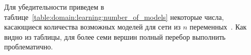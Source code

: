 Для убедительности приведем в таблице~\ref{table:domain:learning:number_of_models} некоторые числа, касающиеся количества возможных моделей для сети из $n$ переменных~\cite{terentyev_2006}.
Как видно из таблицы, для более семи вершин полный перебор выполнить проблематично.



